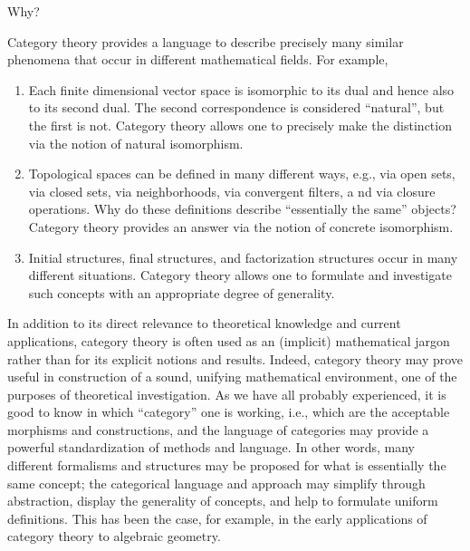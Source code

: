 \begin{plSection}{Why?}
\label{sec:Why?}

\begin{plQuote}
{}
{}
Category theory provides a language 
to describe precisely many similar phenomena that
occur in different mathematical fields. For example,
\begin{enumerate}
  \item  Each finite dimensional vector space is 
  isomorphic to its dual and hence also to its
second dual. The second correspondence is considered 
``natural'', but the first is
not. Category theory allows one to precisely 
make the distinction via the notion
of natural isomorphism.
\item Topological spaces can be defined in many different ways, 
e.g., via open sets, via
closed sets, via neighborhoods, via convergent filters, a
nd via closure operations.
Why do these definitions describe 
``essentially the same'' objects? Category theory
provides an answer via the notion of concrete isomorphism.
\item Initial structures, final structures, 
and factorization structures occur in many different
situations. Category theory allows one to formulate 
and investigate such
concepts with an appropriate degree of generality.
\end{enumerate}

\end{plQuote}

\begin{plQuote}
{}
{}
In addition to its direct relevance to theoretical knowledge and current applications, category theory
is often used as an (implicit) mathematical jargon rather than for its explicit notions and results.
Indeed, category theory may prove useful in construction of a sound, unifying mathematical
environment, one of the purposes of theoretical investigation. As we have all probably experienced, it
is good to know in which ``category'' one is working, i.e., which are the acceptable morphisms and
constructions, and the language of categories may provide a powerful standardization of methods and
language. In other words, many different formalisms and structures may be proposed for what is
essentially the same concept; the categorical language and approach may simplify through abstraction,
display the generality of concepts, and help to formulate uniform definitions. This has been the case,
for example, in the early applications of category theory to algebraic geometry.


\end{plQuote}
\end{plSection}
